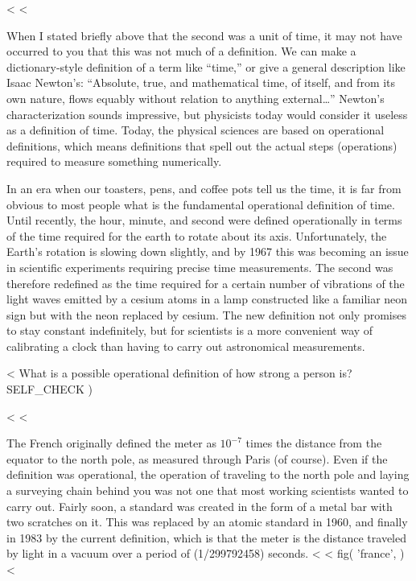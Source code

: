 <%
<%

When I stated briefly above that the second was a unit of
time, it may not have occurred to you that this was not
much of a definition. We can make a dictionary-style
definition of a term like ``time,'' or give a general description
like Isaac Newton's: ``Absolute, true, and mathematical time, of itself, and from
its own nature, flows equably without relation to anything external\ldots''
Newton's characterization sounds impressive, but 
physicists today would consider it useless as a definition
of time. Today, the physical sciences are based on
\label{operational-definitions}operational definitions,
which means definitions that spell out the actual steps
(operations) required to measure something numerically.

In an era when our toasters, pens, and coffee pots tell
us the time, it is far from obvious to most people what is
the fundamental operational definition of time. Until
recently, the hour, minute, and second were defined
operationally in terms of the time required for the earth to
rotate about its axis. Unfortunately, the Earth's rotation
is slowing down slightly, and by 1967 this was becoming an
issue in scientific experiments requiring precise time
measurements. The second was therefore
redefined as the time required for a certain number of
vibrations of the light waves emitted by a cesium atoms in a
lamp constructed like a familiar neon sign but with the neon
replaced by cesium. The new definition not only promises to
stay constant indefinitely, but for scientists is a more
convenient way of calibrating a clock than having to carry
out astronomical measurements.

<%
What is a possible operational definition of how strong a person is?
  SELF_CHECK
  ) %

<%
<%

The French originally defined the meter as $10^{-7}$  times
the distance from the equator to the north pole, as measured
through Paris (of course). Even if the definition was
operational, the operation of traveling to the north pole
and laying a surveying chain behind you was not one that
most working scientists wanted to carry out. Fairly soon, a
standard was created in the form of a metal bar with two
scratches on it. This was replaced by an atomic standard in
1960, and finally in 1983 by the
current definition, which is that
the meter is the
distance traveled by light in a vacuum over a period of
(1/299792458) seconds.
<%
<%
  fig(
    'france',
  )
<%

